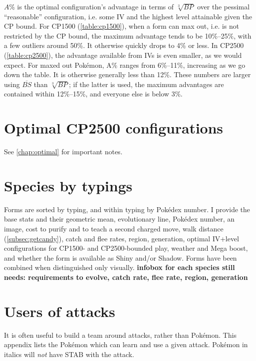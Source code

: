 \documentclass[ebook,10pt,openany,oneside]{memoir}
\begin{document}
$A\%$ is the optimal configuration's advantage in terms of $\sqrt[3]{BP}$
  over the pessimal ``reasonable'' configuration, i.e. some IV
  and the highest level attainable given the CP bound.
For CP1500 (\autoref{table:cp1500}), when a form can max out, i.e. is not restricted by the CP bound,
  the maximum advantage tends to be 10\%--25\%, with a few outliers around 50\%.
It otherwise quickly drops to 4\% or less.
In CP2500 (\autoref{table:cp2500}), the advantage available from IVs is even smaller, as we would expect.
For maxed out Pokémon, A\% ranges from 6\%--11\%, increasing as we go down the table.
It is otherwise generally less than 12\%.
These numbers are larger using $\overline{BS}$ than $\sqrt[3]{BP}$; if the latter is used,
  the maximum advantages are contained within 12\%--15\%, and everyone
  else is below 3\%.


\chapter{Optimal CP2500 configurations}
See \autoref{chap:optimal} for important notes.


\chapter{Species by typings}
\label{chap:speciesbytype}
Forms are sorted by typing, and within typing by Pokédex number.
I provide the base stats and their geometric mean, evolutionary line,
 Pokédex number, an image, cost to purify and to teach a second charged
 move, walk distance (\autoref{subsec:getcandy}), catch and flee rates,
 region, generation, optimal IV+level configurations for CP1500-
 and CP2500-bounded play, weather and Mega boost, and whether the
 form is available as Shiny and/or Shadow.
Forms have been combined when distinguished only visually.
\textbf{infobox for each species still needs: requirements to evolve, catch rate, flee rate, region, generation}


\chapter{Users of attacks}
\label{chap:attackemployers}
It is often useful to build a team around attacks, rather than Pokémon.
This appendix lists the Pokémon which can learn and use a given attack.
Pokémon in italics will \textit{not} have STAB with the attack.
\end{document}
